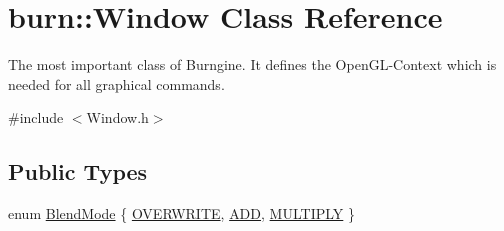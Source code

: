 \hypertarget{classburn_1_1_window}{\section{burn\-:\-:Window Class Reference}
\label{classburn_1_1_window}
}


The most important class of Burngine. It defines the Open\-G\-L-\/\-Context which is needed for all graphical commands.  




{\ttfamily \#include $<$Window.\-h$>$}

\subsection*{Public Types}
\begin{DoxyCompactItemize}
\item 
enum \hyperlink{classburn_1_1_window_ab964403748eb7540e38e649e81711da3}{Blend\-Mode} \{ \hyperlink{classburn_1_1_window_ab964403748eb7540e38e649e81711da3a332b363e82d02455450855da94d4311d}{O\-V\-E\-R\-W\-R\-I\-T\-E}, 
\hyperlink{classburn_1_1_window_ab964403748eb7540e38e649e81711da3acd775a8203f8a3c574eef9858fd3ccb0}{A\-D\-D}, 
\hyperlink{classburn_1_1_window_ab964403748eb7540e38e649e81711da3a012f10a0a89f5327bac712313452f919}{M\-U\-L\-T\-I\-P\-L\-Y}
 \}
\end{DoxyCompactItemize}
